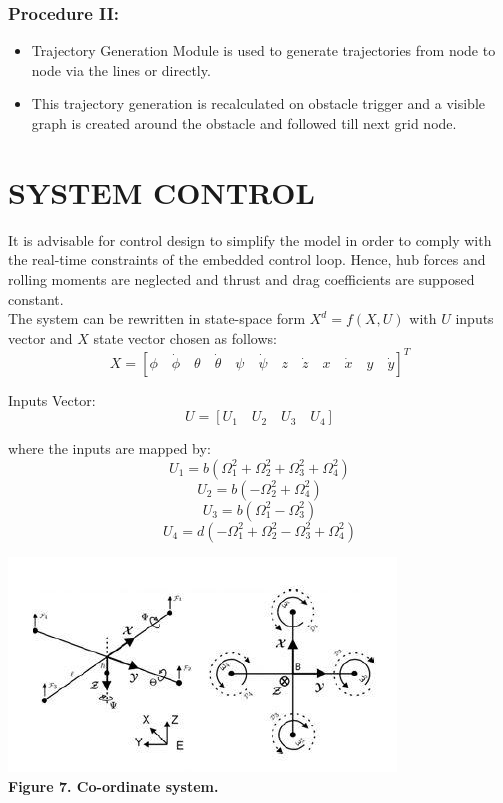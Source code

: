 \documentclass[12pt]{article}
\begin{document}
        \subsubsection*{Procedure II:}
            \begin{itemize}
                \item Trajectory Generation Module is used to generate trajectories from node to node via the lines or directly.
                \item This trajectory generation is recalculated on obstacle trigger and a visible graph is created around the obstacle and followed till next grid node.
            \end{itemize}

\section{SYSTEM CONTROL}
It is advisable for control design to simplify the model in order to comply with the real-time constraints of the embedded control loop. Hence, hub forces and rolling moments are neglected and thrust and drag coefficients are supposed constant. \\
The system can be rewritten in state-space form \(X^{d} = f(X, U)\) with \(U\) inputs vector and \(X\) state vector chosen as follows:
\[ X = [ \phi \quad \dot{\phi} \quad \theta \quad \dot{\theta} \quad \psi \quad \dot{\psi} \quad z \quad \dot{z} \quad x \quad \dot{x} \quad y \quad \dot{y}]^{T} \]

Inputs Vector:
\[ U = [U_1 \quad U_2 \quad U_3 \quad U_4] \]

where the inputs are mapped by:
\[U_1 = b(\Omega_1^2 + \Omega_2^2 + \Omega_3^2 + \Omega_4^2) \]
\[U_2 = b(-\Omega_2^2 + \Omega_4^2)\]
\[U_3 = b(\Omega_1^2 - \Omega_3^2)\]
\[U_4 = d(-\Omega_1^2 + \Omega_2^2 - \Omega_3^2 + \Omega_4^2)\]

\begin{center}\includegraphics{image30} \\
\textbf{Figure 7. Co-ordinate system.}\end{center}\\
\end{document}
